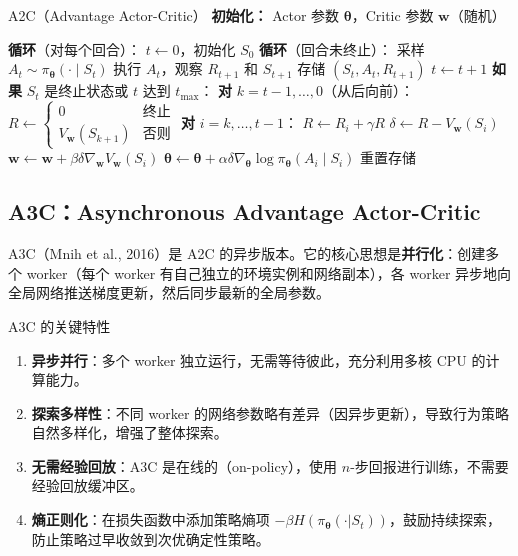 \begin{myalgorithm}{A2C（Advantage Actor-Critic）}
\textbf{初始化：} Actor 参数 $\boldsymbol{\theta}$，Critic 参数 $\mathbf{w}$（随机）

\textbf{循环}（对每个回合）：
\quad $t \leftarrow 0$，初始化 $S_0$
\quad \textbf{循环}（回合未终止）：
\quad \quad 采样 $A_t \sim \pi_{\boldsymbol{\theta}}(\cdot \mid S_t)$
\quad \quad 执行 $A_t$，观察 $R_{t+1}$ 和 $S_{t+1}$
\quad \quad 存储 $(S_t, A_t, R_{t+1})$
\quad \quad $t \leftarrow t+1$
\quad \quad \textbf{如果} $S_t$ 是终止状态或 $t$ 达到 $t_{\max}$：
\quad \quad \quad \textbf{对} $k = t-1, \ldots, 0$（从后向前）：
\quad \quad \quad \quad $R \leftarrow \begin{cases}
0 & \text{终止}\\
V_{\mathbf{w}}(S_{k+1}) & \text{否则}
\end{cases}$
\quad \quad \quad \quad \textbf{对} $i = k, \ldots, t-1$：
\quad \quad \quad \quad \quad $R \leftarrow R_i + \gamma R$
\quad \quad \quad \quad \quad $\delta \leftarrow R - V_{\mathbf{w}}(S_i)$
\quad \quad \quad \quad \quad $\mathbf{w} \leftarrow \mathbf{w} + \beta \delta \nabla_{\mathbf{w}} V_{\mathbf{w}}(S_i)$
\quad \quad \quad \quad \quad $\boldsymbol{\theta} \leftarrow \boldsymbol{\theta} + \alpha \delta \nabla_{\boldsymbol{\theta}} \log \pi_{\boldsymbol{\theta}}(A_i \mid S_i)$
\quad \quad \quad 重置存储
\end{myalgorithm}

\subsection{A3C：Asynchronous Advantage Actor-Critic}

A3C（Mnih et al., 2016）是 A2C 的异步版本。它的核心思想是\textbf{并行化}：创建多个 worker（每个 worker 有自己独立的环境实例和网络副本），各 worker 异步地向全局网络推送梯度更新，然后同步最新的全局参数。

\begin{mydefinition}{A3C 的关键特性}
\begin{enumerate}
    \item \textbf{异步并行}：多个 worker 独立运行，无需等待彼此，充分利用多核 CPU 的计算能力。
    \item \textbf{探索多样性}：不同 worker 的网络参数略有差异（因异步更新），导致行为策略自然多样化，增强了整体探索。
    \item \textbf{无需经验回放}：A3C 是在线的（on-policy），使用 $n$-步回报进行训练，不需要经验回放缓冲区。
    \item \textbf{熵正则化}：在损失函数中添加策略熵项 $-\beta H(\pi_{\boldsymbol{\theta}}(\cdot|S_t))$，鼓励持续探索，防止策略过早收敛到次优确定性策略。
\end{enumerate}
\end{mydefinition}

